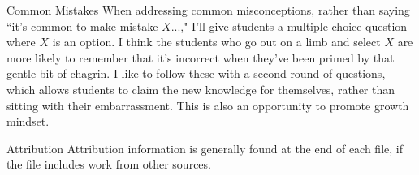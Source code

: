 \documentclass[10pt]{beamer}
\begin{document}
\begin{frame}{Common Mistakes}
When addressing common misconceptions, rather than saying ``it's common to make mistake $X$...," I'll give students a multiple-choice question where $X$ is an option. I think the students who go out on a limb and select $X$ are more likely to remember that it's incorrect when they've been primed by that gentle bit of chagrin. I like to follow these with a second round of questions, which allows students to claim the new knowledge for themselves, rather than sitting with their embarrassment. This is also an opportunity to promote growth mindset.
\end{frame}
\begin{frame}{Attribution}
Attribution information is generally found at the end of each file, if the file includes work from other sources.
\end{frame}

\end{document}
